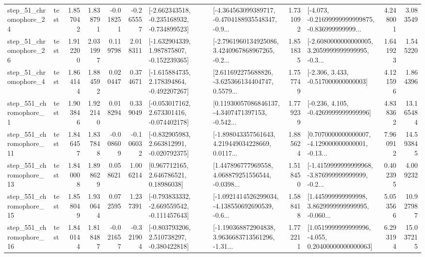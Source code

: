 \begin{tabular}{llrrrrllrlrr}
   step\_51\_chromophore\_24 &      test &      1.857042 &    1.838791 &     -0.018251 & -0.265557 &  [-2.662343518, -0.235168932, -0.734899523] &  [-4.364563099389717, -0.4704188935548347, -0.9... &       1.731092 &  [-4.073, -0.21699999999999875, -0.836999999999... &            4.248001 &          3.083549 \\
   step\_51\_chromophore\_26 &      test &      1.912200 &    2.031997 &      0.119798 &  2.018311 &   [-1.632904339, 1.987875807, -0.152239365] &  [-2.7961960134925086, 3.4240967868967265, -0.2... &       1.851835 &  [-2.6080000000000005, 3.2059999999999995, -0.3... &            1.641923 &          1.545220 \\
    step\_51\_chromophore\_4 &      test &      1.864144 &    1.884592 &      0.020447 &  0.374671 &   [-1.615884735, 2.178394864, -0.492207267] &  [2.611692275688826, -3.625366134404747, 0.5579... &       1.757749 &                [-2.306, 3.433, -0.517000000000003] &            4.121596 &          1.864396 \\
   step\_551\_chromophore\_1 &      test &      1.903846 &    1.922140 &      0.018294 &  0.339049 &   [-0.053017162, 2.673301416, -0.074402178] &  [0.11930057086846137, -4.3407471397153, -0.542... &       1.779239 &               [-0.236, 4.105, -0.4269999999999996] &            4.838362 &         13.165484 \\
  step\_551\_chromophore\_11 &      test &      1.846457 &    1.837848 &     -0.008609 & -0.106032 &   [-0.832905983, 2.663812991, -0.020792375] &  [-1.898043357561643, 4.219449034228669, 0.0117... &       1.885624 &  [0.7070000000000007, -4.129000000000001, -0.13... &            7.960912 &         14.593845 \\
  step\_551\_chromophore\_13 &      test &      1.840008 &    1.898629 &      0.058621 &  1.006214 &      [0.967712165, 2.646786521, 0.18986038] &  [1.447896777969558, 4.068879251556544, -0.0398... &       1.518450 &  [-1.4159999999999968, -3.876999999999999, -0.2... &            0.402395 &          4.009232 \\
  step\_551\_chromophore\_15 &      test &      1.858049 &    1.930644 &      0.072595 &  1.237391 &  [-0.793833332, -2.669559542, -0.111457643] &  [-1.0921414526299034, -4.138550692690539, -0.6... &       1.588418 &  [1.445999999999998, 3.8629999999999995, -0.060... &            5.053566 &         10.927987 \\
  step\_551\_chromophore\_16 &      test &      1.840144 &    1.818487 &     -0.021657 & -0.321904 &   [-0.803793206, 2.510738297, -0.380422818] &  [-1.190368872904838, 3.9636683713561296, -1.31... &       1.772211 &  [1.0519999999999996, -4.055, 0.20400000000000063] &            6.293194 &         15.037215 \\

\end{tabular}
